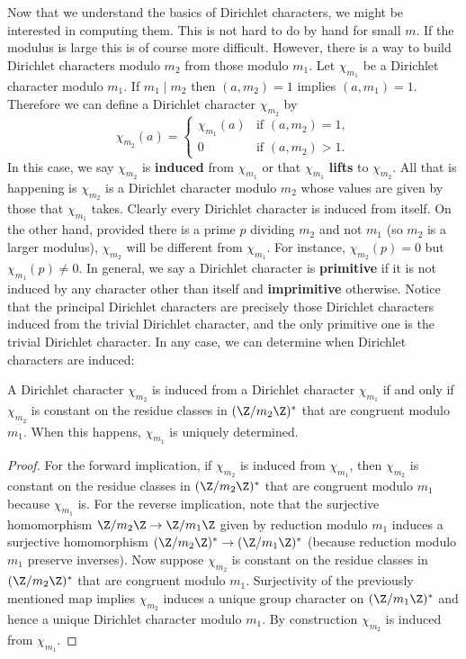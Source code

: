     Now that we understand the basics of Dirichlet characters, we might be interested in computing them. This is not hard to do by hand for small $m$. If the modulus is large this is of course more difficult. However, there is a way to build Dirichlet characters modulo $m_{2}$ from those modulo $m_{1}$. Let $\chi_{m_{1}}$ be a Dirichlet character modulo $m_{1}$. If $m_{1} \mid m_{2}$ then $(a,m_{2}) = 1$ implies $(a,m_{1}) = 1$. Therefore we can define a Dirichlet character $\chi_{m_{2}}$ by
    \[
      \chi_{m_{2}}(a) = \begin{cases} \chi_{m_{1}}(a) & \text{if $(a,m_{2}) = 1$}, \\ 0 & \text{if $(a,m_{2}) > 1$}. \end{cases}
    \]
    In this case, we say $\chi_{m_{2}}$ is \textbf{induced} from $\chi_{m_{1}}$ or that $\chi_{m_{1}}$ \textbf{lifts} to $\chi_{m_{2}}$. All that is happening is $\chi_{m_{2}}$ is a Dirichlet character modulo $m_{2}$ whose values are given by those that $\chi_{m_{1}}$ takes. Clearly every Dirichlet character is induced from itself. On the other hand, provided there is a prime $p$ dividing $m_{2}$ and not $m_{1}$ (so $m_{2}$ is a larger modulus), $\chi_{m_{2}}$ will be different from $\chi_{m_{1}}$. For instance, $\chi_{m_{2}}(p) = 0$ but $\chi_{m_{1}}(p) \neq 0$. In general, we say a Dirichlet character is \textbf{primitive} if it is not induced by any character other than itself and \textbf{imprimitive} otherwise. Notice that the principal Dirichlet characters are precisely those Dirichlet characters induced from the trivial Dirichlet character, and the only primitive one is the trivial Dirichlet character. In any case, we can determine when Dirichlet characters are induced:

    \begin{proposition}\label{prop:Dirichlet_character_induction_classification}
      A Dirichlet character $\chi_{m_{2}}$ is induced from a Dirichlet character $\chi_{m_{1}}$ if and only if $\chi_{m_{2}}$ is constant on the residue classes in $(\Z/m_{2}\Z)^{\ast}$ that are congruent modulo $m_{1}$. When this happens, $\chi_{m_{1}}$ is uniquely determined.
    \end{proposition}
    \begin{proof}
      For the forward implication, if $\chi_{m_{2}}$ is induced from $\chi_{m_{1}}$, then $\chi_{m_{2}}$ is constant on the residue classes in $(\Z/m_{2}\Z)^{\ast}$ that are congruent modulo $m_{1}$ because $\chi_{m_{1}}$ is. For the reverse implication, note that the surjective homomorphism $\Z/m_{2}\Z \to \Z/m_{1}\Z$ given by reduction modulo $m_{1}$ induces a surjective homomorphism $(\Z/m_{2}\Z)^{\ast} \to (\Z/m_{1}\Z)^{\ast}$ (because reduction modulo $m_{1}$ preserve inverses). Now suppose $\chi_{m_{2}}$ is constant on the residue classes in $(\Z/m_{2}\Z)^{\ast}$ that are congruent modulo $m_{1}$. Surjectivity of the previously mentioned map implies $\chi_{m_{2}}$ induces a unique group character on $(\Z/m_{1}\Z)^{\ast}$ and hence a unique Dirichlet character modulo $m_{1}$. By construction $\chi_{m_{2}}$ is induced from $\chi_{m_{1}}$.
    \end{proof}

